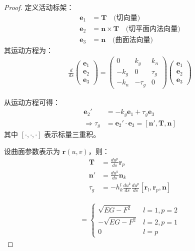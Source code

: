 \documentclass[lang=cn,10pt,thmcnt=section]{elegantbook}
\begin{document}
\begin{proof}
定义活动标架：
\begin{align*}
\mathbf{e}_1 &= \mathbf{T} \quad \text{(切向量)} \\
\mathbf{e}_2 &= \mathbf{n} \times \mathbf{T} \quad \text{(切平面内法向量)} \\
\mathbf{e}_3 &= \mathbf{n} \quad \text{(曲面法向量)}
\end{align*}
其运动方程为：
\begin{align*}
\frac{d}{ds}
\begin{pmatrix}
\mathbf{e}_1 \\
\mathbf{e}_2 \\
\mathbf{e}_3
\end{pmatrix}
=
\begin{pmatrix}
0 & k_g & k_n \\
-k_g & 0 & \tau_g \\
-k_n & -\tau_g & 0
\end{pmatrix}
\begin{pmatrix}
\mathbf{e}_1 \\
\mathbf{e}_2 \\
\mathbf{e}_3
\end{pmatrix}
\end{align*}


从运动方程可得：
\begin{align*}
\mathbf{e}_2' &= -k_g \mathbf{e}_1 + \tau_g \mathbf{e}_3 \\
\Rightarrow \tau_g &= \mathbf{e}_2' \cdot \mathbf{e}_3 = [\mathbf{n}', \mathbf{T}, \mathbf{n}]
\end{align*}
其中 \([\cdot,\cdot,\cdot]\) 表示标量三重积。


设曲面参数表示为 \(\mathbf{r}(u,v)\)，则：
\begin{align*}
\mathbf{T} &= \frac{du^p}{ds} \mathbf{r}_p \\
\mathbf{n}' &= \frac{du^k}{ds} \mathbf{n}_k \\
\tau_g &= -h_k^l \frac{du^k}{ds} \frac{du^p}{ds} [\mathbf{r}_l, \mathbf{r}_p, \mathbf{n}]
\end{align*}

\begin{align*}
[\mathbf{r}_l, \mathbf{r}_p, \mathbf{n}] = 
\begin{cases}
\sqrt{EG-F^2} & l=1, p=2 \\
-\sqrt{EG-F^2} & l=2, p=1 \\
0 & l=p
\end{cases}
\end{align*}


\end{proof}
\end{document}
